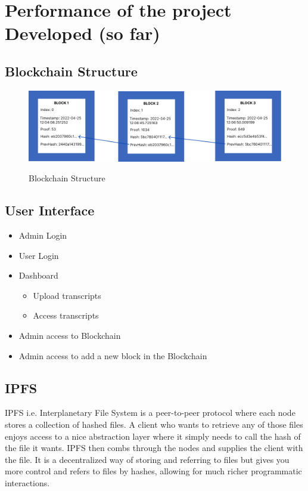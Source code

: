 \newpage
\section{Performance of the project Developed (so far)}

\subsection{Blockchain Structure}
\begin{figure}[h]
    \centering
    \includegraphics[scale=0.45]{images/blockchain.png}\\[0.5cm]
    \caption{Blockchain Structure}
    \label{fig:blockchain}
\end{figure}

\subsection{User Interface}
\begin{itemize}
    \item Admin Login
    \item User Login
    \item Dashboard
    \begin{itemize}
        \item Upload transcripts
        \item Access transcripts
    \end{itemize}
    \item Admin access to Blockchain
    \item Admin access to add a new block in the Blockchain
\end{itemize}

\subsection{IPFS}
IPFS i.e. Interplanetary File System is a peer-to-peer protocol where each node stores a collection of hashed files. A client who wants to retrieve any of those files enjoys access to a nice abstraction layer where it simply needs to call the hash of the file it wants. IPFS then combs through the nodes and supplies the client with the file.
It is a decentralized way of storing and referring to files but gives you more control and refers to files by hashes, allowing for much richer programmatic interactions.

